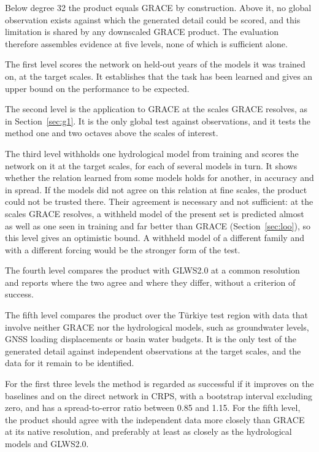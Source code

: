 \documentclass[11pt,a4paper]{article}
\begin{document}
Below degree 32 the product equals GRACE by construction. Above it, no global observation
exists against which the generated detail could be scored, and this limitation is shared by
any downscaled GRACE product. The evaluation therefore assembles evidence at five levels, none
of which is sufficient alone.

The first level scores the network on held-out years of the models it was trained on, at the
target scales. It establishes that the task has been learned and gives an upper bound on the
performance to be expected.

The second level is the application to GRACE at the scales GRACE resolves, as in
Section~\ref{sec:g1}. It is the only global test against observations, and it tests the
method one and two octaves above the scales of interest.

The third level withholds one hydrological model from training and scores the network on it
at the target scales, for each of several models in turn. It shows whether the relation
learned from some models holds for another, in accuracy and in spread. If the models did not
agree on this relation at fine scales, the product could not be trusted there. Their
agreement is necessary and not sufficient: at the scales GRACE resolves, a withheld model of
the present set is predicted almost as well as one seen in training and far better than GRACE
(Section~\ref{sec:loo}), so this level gives an optimistic bound. A withheld model of a
different family and with a different forcing would be the stronger form of the test.

The fourth level compares the product with GLWS2.0 at a common resolution and reports where
the two agree and where they differ, without a criterion of success.

The fifth level compares the product over the Türkiye test region with data that involve
neither GRACE nor the hydrological models, such as groundwater levels, GNSS loading
displacements or basin water budgets. It is the only test of the generated detail against
independent observations at the target scales, and the data for it remain to be identified.

For the first three levels the method is regarded as successful if it improves on the
baselines and on the direct network in CRPS, with a bootstrap interval excluding zero, and has
a spread-to-error ratio between 0.85 and 1.15. For the fifth level, the product should agree
with the independent data more closely than GRACE at its native resolution, and preferably at
least as closely as the hydrological models and GLWS2.0.
\end{document}
